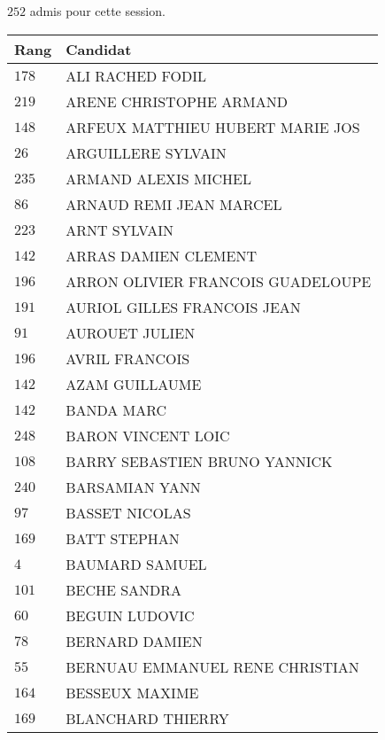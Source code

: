 



  $252$ admis pour cette session.

  \begin{xltabular}{\linewidth}{|l|X|}
    \hline
    \textbf{Rang} & \textbf{Candidat} \\
    \hline
    $178$ & ALI RACHED FODIL \\
    \hline
    $219$ & ARENE CHRISTOPHE ARMAND \\
    \hline
    $148$ & ARFEUX MATTHIEU HUBERT MARIE JOS \\
    \hline
    $26$ & ARGUILLERE SYLVAIN \\
    \hline
    $235$ & ARMAND ALEXIS MICHEL \\
    \hline
    $86$ & ARNAUD REMI JEAN MARCEL \\
    \hline
    $223$ & ARNT SYLVAIN \\
    \hline
    $142$ & ARRAS DAMIEN CLEMENT \\
    \hline
    $196$ & ARRON OLIVIER FRANCOIS GUADELOUPE \\
    \hline
    $191$ & AURIOL GILLES FRANCOIS JEAN \\
    \hline
    $91$ & AUROUET JULIEN \\
    \hline
    $196$ & AVRIL FRANCOIS \\
    \hline
    $142$ & AZAM GUILLAUME \\
    \hline
    $142$ & BANDA MARC \\
    \hline
    $248$ & BARON VINCENT LOIC \\
    \hline
    $108$ & BARRY SEBASTIEN BRUNO YANNICK \\
    \hline
    $240$ & BARSAMIAN YANN \\
    \hline
    $97$ & BASSET NICOLAS \\
    \hline
    $169$ & BATT STEPHAN \\
    \hline
    $4$ & BAUMARD SAMUEL \\
    \hline
    $101$ & BECHE SANDRA \\
    \hline
    $60$ & BEGUIN LUDOVIC \\
    \hline
    $78$ & BERNARD DAMIEN \\
    \hline
    $55$ & BERNUAU EMMANUEL RENE CHRISTIAN \\
    \hline
    $164$ & BESSEUX MAXIME \\
    \hline
    $169$ & BLANCHARD THIERRY \\
    \hline

\end{xltabular}
